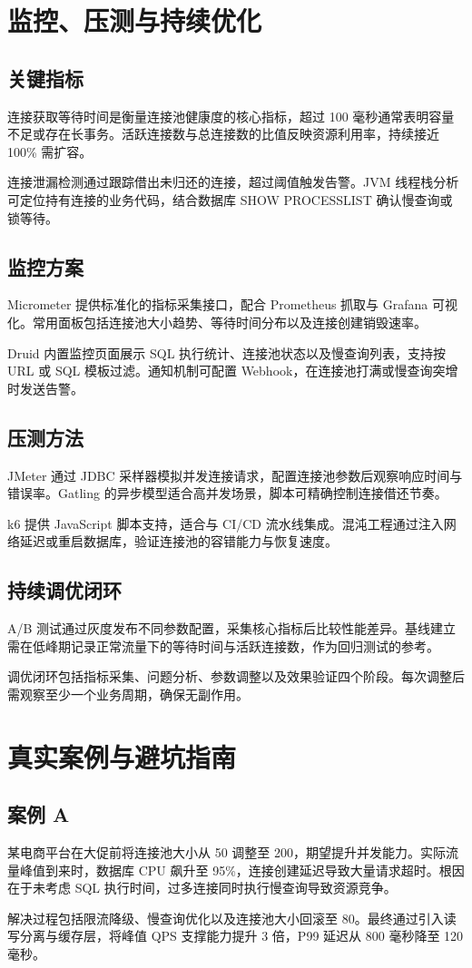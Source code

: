 \chapter{监控、压测与持续优化}
\section{关键指标}
连接获取等待时间是衡量连接池健康度的核心指标，超过 100 毫秒通常表明容量不足或存在长事务。活跃连接数与总连接数的比值反映资源利用率，持续接近 100\%{} 需扩容。\par
连接泄漏检测通过跟踪借出未归还的连接，超过阈值触发告警。JVM 线程栈分析可定位持有连接的业务代码，结合数据库 SHOW PROCESSLIST 确认慢查询或锁等待。\par
\section{监控方案}
Micrometer 提供标准化的指标采集接口，配合 Prometheus 抓取与 Grafana 可视化。常用面板包括连接池大小趋势、等待时间分布以及连接创建销毁速率。\par
Druid 内置监控页面展示 SQL 执行统计、连接池状态以及慢查询列表，支持按 URL 或 SQL 模板过滤。通知机制可配置 Webhook，在连接池打满或慢查询突增时发送告警。\par
\section{压测方法}
JMeter 通过 JDBC 采样器模拟并发连接请求，配置连接池参数后观察响应时间与错误率。Gatling 的异步模型适合高并发场景，脚本可精确控制连接借还节奏。\par
k6 提供 JavaScript 脚本支持，适合与 CI/CD 流水线集成。混沌工程通过注入网络延迟或重启数据库，验证连接池的容错能力与恢复速度。\par
\section{持续调优闭环}
A/B 测试通过灰度发布不同参数配置，采集核心指标后比较性能差异。基线建立需在低峰期记录正常流量下的等待时间与活跃连接数，作为回归测试的参考。\par
调优闭环包括指标采集、问题分析、参数调整以及效果验证四个阶段。每次调整后需观察至少一个业务周期，确保无副作用。\par
\chapter{真实案例与避坑指南}
\section{案例 A}
某电商平台在大促前将连接池大小从 50 调整至 200，期望提升并发能力。实际流量峰值到来时，数据库 CPU 飙升至 95\%{}，连接创建延迟导致大量请求超时。根因在于未考虑 SQL 执行时间，过多连接同时执行慢查询导致资源竞争。\par
解决过程包括限流降级、慢查询优化以及连接池大小回滚至 80。最终通过引入读写分离与缓存层，将峰值 QPS 支撑能力提升 3 倍，P99 延迟从 800 毫秒降至 120 毫秒。\par
